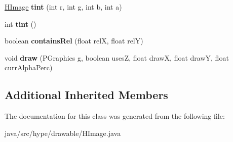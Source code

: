\begin{DoxyCompactItemize}
\item 
\hypertarget{classhype_1_1drawable_1_1_h_image_a5a3f54f38e840c9ea82f00e7e4dd6467}{\hyperlink{classhype_1_1drawable_1_1_h_image}{H\-Image} {\bfseries tint} (int r, int g, int b, int a)}\label{classhype_1_1drawable_1_1_h_image_a5a3f54f38e840c9ea82f00e7e4dd6467}

\item 
\hypertarget{classhype_1_1drawable_1_1_h_image_adf558fb9f12c04e7de5b345f8d7a00c7}{int {\bfseries tint} ()}\label{classhype_1_1drawable_1_1_h_image_adf558fb9f12c04e7de5b345f8d7a00c7}

\item 
\hypertarget{classhype_1_1drawable_1_1_h_image_a115ff4218c705ab812aa91c0a5c0ba40}{boolean {\bfseries contains\-Rel} (float rel\-X, float rel\-Y)}\label{classhype_1_1drawable_1_1_h_image_a115ff4218c705ab812aa91c0a5c0ba40}

\item 
\hypertarget{classhype_1_1drawable_1_1_h_image_a146ed5da0e04dac7cb7f2e42f18ba47c}{void {\bfseries draw} (P\-Graphics g, boolean uses\-Z, float draw\-X, float draw\-Y, float curr\-Alpha\-Perc)}\label{classhype_1_1drawable_1_1_h_image_a146ed5da0e04dac7cb7f2e42f18ba47c}

\end{DoxyCompactItemize}
\subsection*{Additional Inherited Members}


The documentation for this class was generated from the following file\-:\begin{DoxyCompactItemize}
\item 
java/src/hype/drawable/H\-Image.\-java\end{DoxyCompactItemize}
